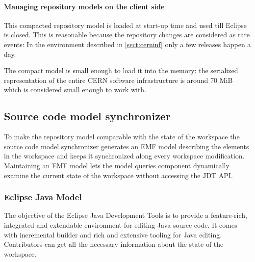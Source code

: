 \paragraph{Managing repository models on the client side}
This compacted repository model is loaded at start-up time and used till Eclipse
is closed. This is reasonable because the repository changes are considered as rare events: 
In the environment described in \autoref{sect:cerninf} only a few releases happen a day.

The compact model is small enough to load it into the memory: the serialized
representation of the entire CERN software infrastructure is around 70 MiB which
is considered small enough to work with.

\subsection{Source code model synchronizer}
To make the repository model comparable with the state of the workspace the
source code model synchronizer generates an EMF model describing the elements
in the workspace and keeps it synchronized along every workspace modification.
Maintaining an EMF model lets the model queries component dynamically examine
the current state of the workspace without accessing the JDT API.

\subsubsection{Eclipse Java Model}
The objective of the Eclipse Java Development Tools \cite{JDT} is to provide a
feature-rich, integrated and extendable environment for editing Java source
code. It comes with incremental builder and rich and extensive tooling for Java
editing. Contributors can get all the necessary information about the state of the
workspace.

